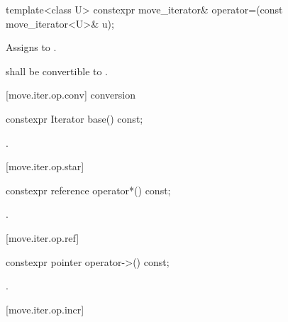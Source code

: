%
\begin{itemdecl}
template<class U> constexpr move_iterator& operator=(const move_iterator<U>& u);
\end{itemdecl}

\begin{itemdescr}
\pnum
\effects Assigns  to
.

\pnum
\requires {} shall be convertible to
.
\end{itemdescr}

[move.iter.op.conv]{ conversion}

%
\begin{itemdecl}
constexpr Iterator base() const;
\end{itemdecl}

\begin{itemdescr}
\pnum
\returns {}.
\end{itemdescr}

[move.iter.op.star]{}

%
\begin{itemdecl}
constexpr reference operator*() const;
\end{itemdecl}

\begin{itemdescr}
\pnum
\returns {}.
\end{itemdescr}

[move.iter.op.ref]{}


%
\begin{itemdecl}
constexpr pointer operator->() const;
\end{itemdecl}

\begin{itemdescr}
\pnum
\returns {}.
\end{itemdescr}

[move.iter.op.incr]{}

